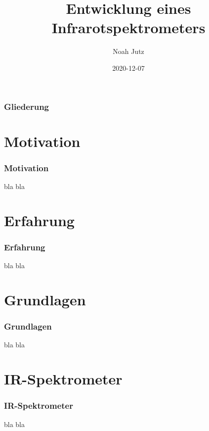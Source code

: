 \documentclass{beamer}
\title{Entwicklung eines Infrarotspektrometers}
\author{Noah Jutz}
\institute{Privat-Gymnasium PINDL Regensburg}
\date{2020-12-07}
\begin{document}
\frame{\titlepage}

\begin{frame}
    \frametitle{Gliederung}
    \tableofcontents
\end{frame}

\section{Motivation}
\begin{frame}
    \frametitle{Motivation}
    bla bla
\end{frame}

\section{Erfahrung}
\begin{frame}
    \frametitle{Erfahrung}
    bla bla
\end{frame}

\section{Grundlagen}
\begin{frame}
    \frametitle{Grundlagen}
    bla bla
\end{frame}

\section{IR-Spektrometer}
\begin{frame}
    \frametitle{IR-Spektrometer}
    bla bla
\end{frame}
\end{document}
